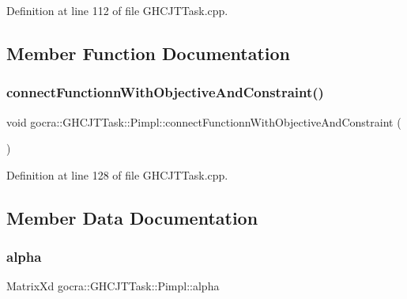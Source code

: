Definition at line 112 of file G\+H\+C\+J\+T\+Task.\+cpp.



\subsection{Member Function Documentation}
\hypertarget{structgocra_1_1GHCJTTask_1_1Pimpl_aeedb4e2ac7e5dc4b68655b124ee8ed58}{}\label{structgocra_1_1GHCJTTask_1_1Pimpl_aeedb4e2ac7e5dc4b68655b124ee8ed58} 
\subsubsection{\texorpdfstring{connect\+Functionn\+With\+Objective\+And\+Constraint()}{connectFunctionnWithObjectiveAndConstraint()}}
{\footnotesize\ttfamily void gocra\+::\+G\+H\+C\+J\+T\+Task\+::\+Pimpl\+::connect\+Functionn\+With\+Objective\+And\+Constraint (\begin{DoxyParamCaption}{ }\end{DoxyParamCaption})\hspace{0.3cm}{\ttfamily [inline]}}



Definition at line 128 of file G\+H\+C\+J\+T\+Task.\+cpp.



\subsection{Member Data Documentation}
\hypertarget{structgocra_1_1GHCJTTask_1_1Pimpl_a71d5221274d0ee84040992042d609cec}{}\label{structgocra_1_1GHCJTTask_1_1Pimpl_a71d5221274d0ee84040992042d609cec} 
\subsubsection{\texorpdfstring{alpha}{alpha}}
{\footnotesize\ttfamily Matrix\+Xd gocra\+::\+G\+H\+C\+J\+T\+Task\+::\+Pimpl\+::alpha}



